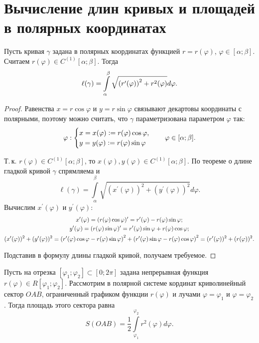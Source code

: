 \section{Вычисление длин кривых и площадей в полярных координатах}

\begin{theorem}
    Пусть кривая $\gamma$ задана в полярных координатах функцией $r = r(\varphi)$, $\varphi \in [\alpha; \beta]$. Считаем $r(\varphi) \in C^{(1)}[\alpha; \beta]$. Тогда
    \[
        \ell(\gamma) = \int\limits_\alpha^\beta\sqrt{\left(r^\prime(\varphi)\right)^2 + r^2(\varphi)}d\varphi.
    \]
\end{theorem}

\begin{proof}
    Равенства $x = r\cos\varphi$ и $y = r\sin\varphi$ связывают декартовы координаты с полярными, поэтому можно считать, что $\gamma$ параметризована параметром $\varphi$ так:
    \[
        \varphi:
        \begin{cases}
            x = x(\varphi) \vcentcolon = r(\varphi)\cos\varphi,\\
            y = y(\varphi) \vcentcolon = r(\varphi)\sin\varphi
        \end{cases}\quad \varphi \in [\alpha; \beta].
    \]

    Т.\,к. $r(\varphi) \in C^{(1)}[\alpha; \beta]$, то $x(\varphi), y(\varphi) \in C^{(1)}[\alpha; \beta]$. По теореме о длине гладкой кривой $\gamma$ спрямляема и
    \[
        \ell(\gamma) = \int\limits_\alpha^\beta\sqrt{(x^\prime(\varphi))^2 + (y^\prime(\varphi))^2}d\varphi.
    \]
    Вычислим $x^\prime(\varphi)$ и $y^\prime(\varphi)$:
    \begin{gather*}
        x^\prime(\varphi) = (r(\varphi)\cos\varphi)^\prime = r^\prime(\varphi) - r(\varphi)\sin\varphi;\\
        y^\prime(\varphi) = (r(\varphi)\sin\varphi)^\prime = r^\prime(\varphi)\sin\varphi + r(\varphi)\cos\varphi;\\
        (x^\prime(\varphi))^2 + (y^\prime(\varphi))^2 = \left(r^\prime(\varphi)\cos\varphi - r(\varphi)\sin\varphi\right)^2 + \left(r^\prime(\varphi)\sin\varphi - r(\varphi)\cos\varphi\right)^2 = (r^\prime(\varphi))^2 + (r(\varphi))^2.
    \end{gather*}

    Подставив в формулу длины гладкой кривой, получаем требуемое.
\end{proof}

\begin{theorem}
    Пусть на отрезка $[\varphi_1; \varphi_2] \subset [0; 2\pi]$ задана непрерывная функция $r(\varphi) \in R[\varphi_1; \varphi_2]$. Рассмотрим в полярной системе кординат криволинейный сектор $OAB$, ограниченный графиком функции $r(\varphi)$ и лучами $\varphi = \varphi_1$ и $\varphi = \varphi_2$. Тогда площадь этого сектора равна
    \[
        S(OAB) = \frac{1}{2}\int\limits_{\varphi_1}^{\varphi_2}r^2(\varphi)d\varphi.
    \]
\end{theorem}

